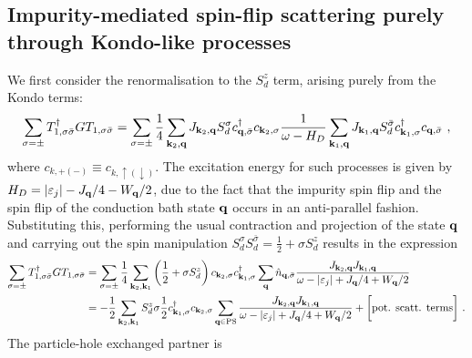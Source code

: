 \documentclass{revtex4-2}
\begin{document}
\subsection{Impurity-mediated spin-flip scattering purely through Kondo-like processes}
We first consider the renormalisation to the \(S_d^z\) term, arising purely from the Kondo terms:
\begin{equation}\begin{aligned}
	\sum_{\sigma=\pm}T_{1,\sigma\bar\sigma}^\dagger G T_{1,\sigma\bar\sigma} = \sum_{\sigma=\pm}\frac{1}{4}\sum_{{\bf k}_2,{\bf q}}J_{{\bf k}_2,{\bf q}} S_d^\sigma c^\dagger_{{\bf q},\bar\sigma} c_{{\bf k}_2,\sigma} \frac{1}{\omega - H_D}\sum_{{\bf k}_1,{\bf q}}J_{{\bf k}_1,{\bf q}} S_d^{\bar\sigma} c^\dagger_{{\bf k}_1,\sigma} c_{{\bf q},\bar\sigma}~,
\end{aligned}\end{equation}
where \(c_{k,+(-)} \equiv c_{k,\uparrow(\downarrow)}\). The excitation energy for such processes is given by \(H_D = |\varepsilon_j| - J_{{\bf q}}/4 - W_{{\bf q}}/2\), due to the fact that the impurity spin flip and the spin flip of the conduction bath state \({\bf q}\) occurs in an anti-parallel fashion. Substituting this, performing the usual contraction and projection of the state \({\bf q}\) and carrying out the spin manipulation \(S_d^\sigma S_d^{\bar\sigma} = \frac{1}{2} + \sigma S_d^z\) results in the expression
\begin{equation}\begin{aligned}\label{t1t1p}
	\sum_{\sigma=\pm}T_{1,\sigma\bar\sigma}^\dagger G T_{1,\sigma\bar\sigma} &= \sum_{\sigma=\pm}\frac{1}{4}\sum_{{\bf k}_2,{\bf k}_1} \left(\frac{1}{2} + \sigma S_d^z\right) c_{{\bf k}_2,\sigma} c^\dagger_{{\bf k}_1,\sigma}\sum_{{\bf q}}  \hat n_{{\bf q},\bar\sigma} \frac{J_{{\bf k}_2,{\bf q}} J_{{\bf k}_1,{\bf q}}}{\omega - |\varepsilon_j| + J_{{\bf q}}/4 + W_{{\bf q}}/2}\\
										 &= -\frac{1}{2}\sum_{{\bf k}_2,{\bf k}_1} S_d^z \sigma \frac{1}{2}c^\dagger_{{\bf k}_1,\sigma}c_{{\bf k}_2,\sigma} \sum_{{\bf q} \in \text{PS}} \frac{J_{{\bf k}_2,{\bf q}} J_{{\bf k}_1,{\bf q}}}{\omega - |\varepsilon_j| + J_{{\bf q}}/4 + W_{{\bf q}}/2} + \bigg[\text{pot. scatt. terms}\bigg]~.
\end{aligned}\end{equation}
The particle-hole exchanged partner is
\end{document}
